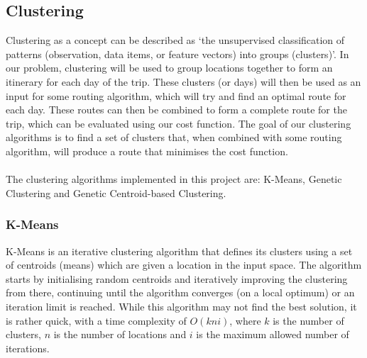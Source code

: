 

\subsection{Clustering}\label{subsec:clustering}
Clustering as a concept can be described as `the unsupervised classification of patterns (observation, data items, or
feature vectors) into groups (clusters)'.
In our problem, clustering will be used to group locations together to form an itinerary for each day of the trip.
These clusters (or days) will then be used as an input for some routing algorithm, which will try and find an
optimal route for each day.
These routes can then be combined to form a complete route for the trip, which can be evaluated using our cost
function.
The goal of our clustering algorithms is to find a set of clusters that, when combined with some routing algorithm,
will produce a route that minimises the cost function.\\
\\
The clustering algorithms implemented in this project are: K-Means, Genetic Clustering and Genetic Centroid-based
Clustering.

\subsubsection{K-Means}\label{subsubsec:k-means}
K-Means is an iterative clustering algorithm that defines its clusters using a set of centroids (means) which are
given a location in the input space.
The algorithm starts by initialising random centroids and iteratively improving the clustering from there, continuing
until the algorithm converges (on a local optimum) or an iteration limit is reached.
While this algorithm may not find the best solution, it is rather quick, with a time complexity of $O(kni)$, where $k$
is the number of clusters, $n$ is the number of locations and $i$ is the maximum allowed number of iterations.\\

